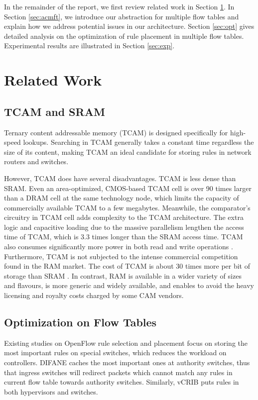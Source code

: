 \documentclass[10pt,twocolumn,letterpaper]{article}
\begin{document}
In the remainder of the report, we first review related work in Section \ref{sec:rw}. In Section \ref{sec:acmft}, we introduce our abstraction for multiple flow tables and explain how we address potential issues in our architecture. Section \ref{sec:opt} gives detailed analysis on the optimization of rule placement in multiple flow tables. Experimental results are illustrated in Section \ref{sec:exp}.

\section{Related Work} \label{sec:rw}


\subsection{TCAM and SRAM}

Ternary content addressable memory (TCAM) is designed specifically for high-speed lookups. Searching in TCAM generally takes a constant time regardless the size of its content, making TCAM an ideal candidate for storing rules in network routers and switches.

However, TCAM does have several disadvantages. TCAM is less dense than SRAM. Even an area-optimized, CMOS-based TCAM cell is over 90 times larger than a DRAM cell at the same technology node, which limits the capacity of commercially available TCAM to a few megabytes\cite{guo2011resistive}. Meanwhile, the comparator’s circuitry in TCAM cell adds complexity to the TCAM architecture. The extra logic and capacitive loading due to the massive parallelism lengthen the access time of TCAM, which is 3.3 times longer than the SRAM access time\cite{dharmapurikar2006longest}. TCAM also consumes significantly more power in both read and write operations \cite{mahoney2005parallel}. Furthermore, TCAM is not subjected to the intense commercial competition found in the RAM market. The cost of TCAM is about 30 times more per bit of storage than SRAM \cite{taylor2005survey}. In contrast, RAM is available in a wider variety of sizes and flavours, is more generic and widely available, and enables to avoid the heavy licensing and royalty costs charged by some CAM vendors\cite{ullahz}.

\subsection{Optimization on Flow Tables} 
Existing studies on OpenFlow rule selection and placement focus on storing the most important rules on special switches, which reduces the workload on controllers. DIFANE\cite{yu2010scalable} caches the most important ones at authority switches, thus that ingress switches will redirect packets which cannot match any rules in current flow table towards authority switches. Similarly, vCRIB\cite{moshref2013vcrib} puts rules in both hypervisors and switches. 
\end{document}
